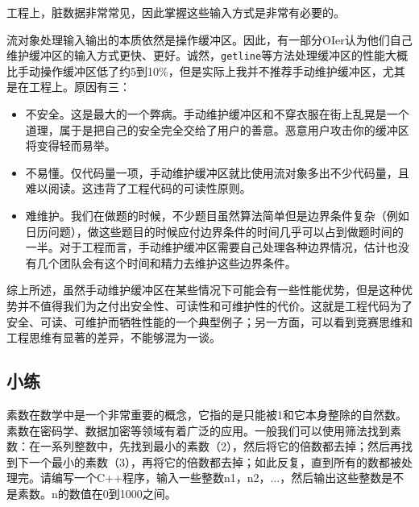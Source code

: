 工程上，脏数据非常常见，因此掌握这些输入方式是非常有必要的。
\begin{caution}
    流对象处理输入输出的本质依然是操作缓冲区。因此，有一部分OIer认为他们自己维护缓冲区的输入方式更快、更好。诚然，\texttt{getline}等方法处理缓冲区的性能大概比手动操作缓冲区低了约5到10\%，但是实际上我并不推荐手动维护缓冲区，尤其是在工程上。原因有三：
    \begin{itemize}
        \item 不安全。这是最大的一个弊病。手动维护缓冲区和不穿衣服在街上乱晃是一个道理，属于是把自己的安全完全交给了用户的善意。恶意用户攻击你的缓冲区将变得轻而易举。
        \item 不易懂。仅代码量一项，手动维护缓冲区就比使用流对象多出不少代码量，且难以阅读。这违背了工程代码的可读性原则。
        \item 难维护。我们在做题的时候，不少题目虽然算法简单但是边界条件复杂（例如日历问题），做这些题目的时候应付边界条件的时间几乎可以占到做题时间的一半。对于工程而言，手动维护缓冲区需要自己处理各种边界情况，估计也没有几个团队会有这个时间和精力去维护这些边界条件。
    \end{itemize}
    
    综上所述，虽然手动维护缓冲区在某些情况下可能会有一些性能优势，但是这种优势并不值得我们为之付出安全性、可读性和可维护性的代价。这就是工程代码为了安全、可读、可维护而牺牲性能的一个典型例子；另一方面，可以看到竞赛思维和工程思维有显著的差异，不能够混为一谈。
\end{caution}

\subsection{小练}

\begin{example}
  素数在数学中是一个非常重要的概念，它指的是只能被1和它本身整除的自然数。素数在密码学、数据加密等领域有着广泛的应用。一般我们可以使用筛法找到素数：在一系列整数中，先找到最小的素数（2），然后将它的倍数都去掉；然后再找到下一个最小的素数（3），再将它的倍数都去掉；如此反复，直到所有的数都被处理完。请编写一个C++程序，输入一些整数n1，n2，...，然后输出这些整数是不是素数。n的数值在0到1000之间。
\end{example}

